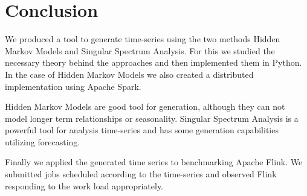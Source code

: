 \chapter{Conclusion}\label{chapter:conclusion}

We produced a tool to generate time-series using the two methods Hidden Markov Models and Singular Spectrum Analysis. For this we studied the necessary theory behind the approaches and then implemented them in Python. In the case of Hidden Markov Models we also created a distributed implementation using Apache Spark. 

Hidden Markov Models are good tool for generation, although they can not model longer term relationships or seasonality. Singular Spectrum Analysis is a powerful tool for analysis time-series and has some generation capabilities utilizing forecasting. 

Finally we applied the generated time series to benchmarking Apache Flink. We submitted jobs scheduled according to the time-series and observed Flink responding to the work load appropriately. 